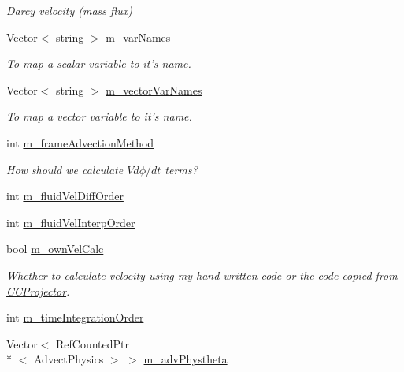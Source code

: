\begin{DoxyCompactItemize}
\begin{DoxyCompactList}\small\item\em Darcy velocity (mass flux) \end{DoxyCompactList}\item 
\hypertarget{classamr_mushy_layer_a50ec9a3ae0a85f03cf5a85cf7d02da20}{Vector$<$ string $>$ \hyperlink{classamr_mushy_layer_a50ec9a3ae0a85f03cf5a85cf7d02da20}{m\-\_\-var\-Names}}\label{classamr_mushy_layer_a50ec9a3ae0a85f03cf5a85cf7d02da20}

\begin{DoxyCompactList}\small\item\em To map a scalar variable to it's name. \end{DoxyCompactList}\item 
\hypertarget{classamr_mushy_layer_aa80cc150bd308f3bacbcfeacaa9f4688}{Vector$<$ string $>$ \hyperlink{classamr_mushy_layer_aa80cc150bd308f3bacbcfeacaa9f4688}{m\-\_\-vector\-Var\-Names}}\label{classamr_mushy_layer_aa80cc150bd308f3bacbcfeacaa9f4688}

\begin{DoxyCompactList}\small\item\em To map a vector variable to it's name. \end{DoxyCompactList}\item 
\hypertarget{classamr_mushy_layer_a0f3a4a2b6f77184814e3ef2f522a4438}{int \hyperlink{classamr_mushy_layer_a0f3a4a2b6f77184814e3ef2f522a4438}{m\-\_\-frame\-Advection\-Method}}\label{classamr_mushy_layer_a0f3a4a2b6f77184814e3ef2f522a4438}

\begin{DoxyCompactList}\small\item\em How should we calculate $ V d\phi / dt $ terms? \end{DoxyCompactList}\item 
int \hyperlink{classamr_mushy_layer_adca557c16f43ad73fcb91bc1b05b6862}{m\-\_\-fluid\-Vel\-Diff\-Order}
\item 
int \hyperlink{classamr_mushy_layer_a161be4ad2be61ff80d97834ac501a080}{m\-\_\-fluid\-Vel\-Interp\-Order}
\item 
\hypertarget{classamr_mushy_layer_aac52ab8066830f1e08ac6e8d8b06a68c}{bool \hyperlink{classamr_mushy_layer_aac52ab8066830f1e08ac6e8d8b06a68c}{m\-\_\-own\-Vel\-Calc}}\label{classamr_mushy_layer_aac52ab8066830f1e08ac6e8d8b06a68c}

\begin{DoxyCompactList}\small\item\em Whether to calculate velocity using my hand written code or the code copied from \hyperlink{class_c_c_projector}{C\-C\-Projector}. \end{DoxyCompactList}\item 
int \hyperlink{classamr_mushy_layer_a1c6df6b648acbc11679adc49c7148992}{m\-\_\-time\-Integration\-Order}
\item 
\hypertarget{classamr_mushy_layer_a086a7a08cc6983e024c1c72f8104f4c3}{Vector$<$ Ref\-Counted\-Ptr\\*
$<$ Advect\-Physics $>$ $>$ \hyperlink{classamr_mushy_layer_a086a7a08cc6983e024c1c72f8104f4c3}{m\-\_\-adv\-Phystheta}}\label{classamr_mushy_layer_a086a7a08cc6983e024c1c72f8104f4c3}


\end{DoxyCompactItemize}

